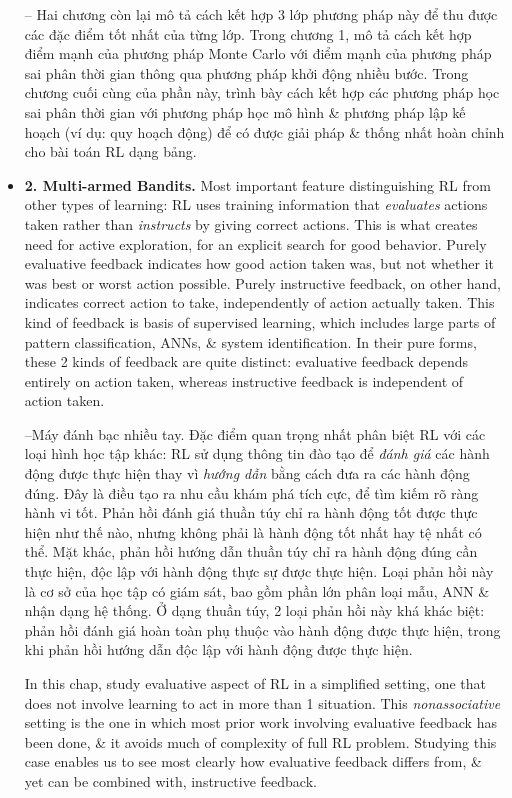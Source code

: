 \documentclass{article}
\begin{document}
\begin{itemize}
    -- Hai chương còn lại mô tả cách kết hợp 3 lớp phương pháp này để thu được các đặc điểm tốt nhất của từng lớp. Trong chương 1, mô tả cách kết hợp điểm mạnh của phương pháp Monte Carlo với điểm mạnh của phương pháp sai phân thời gian thông qua phương pháp khởi động nhiều bước. Trong chương cuối cùng của phần này, trình bày cách kết hợp các phương pháp học sai phân thời gian với phương pháp học mô hình \& phương pháp lập kế hoạch (ví dụ: quy hoạch động) để có được giải pháp \& thống nhất hoàn chỉnh cho bài toán RL dạng bảng.
    \item {\bf2. Multi-armed Bandits.} Most important feature distinguishing RL from other types of learning: RL uses training information that {\it evaluates} actions taken rather than {\it instructs} by giving correct actions. This is what creates need for active exploration, for an explicit search for good behavior. Purely evaluative feedback indicates how good action taken was, but not whether it was best or worst action possible. Purely instructive feedback, on other hand, indicates correct action to take, independently of action actually taken. This kind of feedback is basis of supervised learning, which includes large parts of pattern classification, ANNs, \& system identification. In their pure forms, these 2 kinds of feedback are quite distinct: evaluative feedback depends entirely on action taken, whereas instructive feedback is independent of action taken.

    --{\sf Máy đánh bạc nhiều tay.} Đặc điểm quan trọng nhất phân biệt RL với các loại hình học tập khác: RL sử dụng thông tin đào tạo để {\it đánh giá} các hành động được thực hiện thay vì {\it hướng dẫn} bằng cách đưa ra các hành động đúng. Đây là điều tạo ra nhu cầu khám phá tích cực, để tìm kiếm rõ ràng hành vi tốt. Phản hồi đánh giá thuần túy chỉ ra hành động tốt được thực hiện như thế nào, nhưng không phải là hành động tốt nhất hay tệ nhất có thể. Mặt khác, phản hồi hướng dẫn thuần túy chỉ ra hành động đúng cần thực hiện, độc lập với hành động thực sự được thực hiện. Loại phản hồi này là cơ sở của học tập có giám sát, bao gồm phần lớn phân loại mẫu, ANN \& nhận dạng hệ thống. Ở dạng thuần túy, 2 loại phản hồi này khá khác biệt: phản hồi đánh giá hoàn toàn phụ thuộc vào hành động được thực hiện, trong khi phản hồi hướng dẫn độc lập với hành động được thực hiện.

    In this chap, study evaluative aspect of RL in a simplified setting, one that does not involve learning to act in more than 1 situation. This {\it nonassociative} setting is the one in which most prior work involving evaluative feedback has been done, \& it avoids much of complexity of full RL problem. Studying this case enables us to see most clearly how evaluative feedback differs from, \& yet can be combined with, instructive feedback.


\end{itemize}
\end{document}
